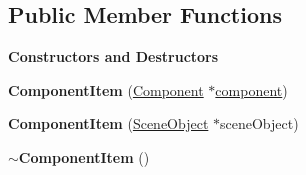 \subsection*{Public Member Functions}
\begin{Indent}\textbf{ Constructors and Destructors}\par
\begin{DoxyCompactItemize}
\item 
\mbox{\label{classrev_1_1_view_1_1_component_item_af8e587b4c7eda12b3d8de419ba2f61b0}} 
{\bfseries Component\+Item} (\mbox{\hyperlink{classrev_1_1_component}{Component}} $\ast$\mbox{\hyperlink{classrev_1_1_view_1_1_component_item_a40d3b3bc333954297e9239d42e6b3b43}{component}})
\item 
\mbox{\label{classrev_1_1_view_1_1_component_item_a6295dfc8b7f45a9984701e65ba1142e3}} 
{\bfseries Component\+Item} (\mbox{\hyperlink{classrev_1_1_scene_object}{Scene\+Object}} $\ast$scene\+Object)
\item 
\mbox{\label{classrev_1_1_view_1_1_component_item_af560bfcc2e6ad27cad828e5cfb49970c}} 
{\bfseries $\sim$\+Component\+Item} ()
\end{DoxyCompactItemize}
\end{Indent}
